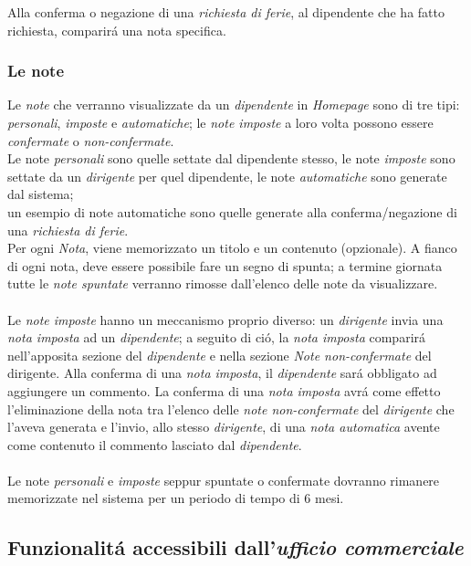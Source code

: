 \documentclass[paper=a4, fontsize=11pt]{scrartcl} %
\numberwithin{equation}{section} %
\numberwithin{figure}{section} %
\numberwithin{table}{section} %
\begin{document}
Alla conferma o negazione di una \textit{richiesta di ferie}, al dipendente che ha fatto richiesta, comparir\'a una
nota specifica.


\subsubsection{Le note}

Le \textit{note} che verranno visualizzate da un \textit{dipendente} in \textit{Homepage} sono di tre tipi:
\textit{personali}, \textit{imposte} e \textit{automatiche}; le \textit{note imposte} a loro volta possono
essere \textit{confermate} o \textit{non-confermate}.\\
Le note \textit{personali} sono quelle settate dal dipendente stesso,
le note \textit{imposte} sono settate da un \textit{dirigente} per quel dipendente,
le note \textit{automatiche} sono generate dal sistema;\\
un esempio di note automatiche sono quelle generate alla conferma/negazione di una \textit{richiesta di ferie}.\\
Per ogni \textit{Nota}, viene memorizzato un titolo e un contenuto (opzionale).
A fianco di ogni nota, deve essere possibile fare un segno di spunta; a termine giornata tutte le \textit{note spuntate}
verranno rimosse dall'elenco delle note da visualizzare.\\\\
Le \textit{note imposte} hanno un meccanismo proprio diverso:
un \textit{dirigente} invia una \textit{nota imposta} ad un \textit{dipendente}; a seguito di ci\'o, la \textit{nota imposta}
comparir\'a nell'apposita sezione del \textit{dipendente} e nella sezione \textit{Note non-confermate} del dirigente.
Alla conferma di una \textit{nota imposta}, il \textit{dipendente} sar\'a obbligato ad aggiungere un commento.
La conferma di una \textit{nota imposta} avr\'a come effetto l'eliminazione della nota tra l'elenco delle \textit{note non-confermate}
del \textit{dirigente} che l'aveva generata e l'invio, allo stesso \textit{dirigente}, di una \textit{nota automatica}
avente come contenuto il commento lasciato dal \textit{dipendente}.\\\\
Le note \textit{personali} e \textit{imposte} seppur spuntate o confermate dovranno rimanere memorizzate nel sistema per un periodo
di tempo di 6 mesi.

\subsection{Funzionalit\'a accessibili dall'\textit{ufficio commerciale}}
\end{document}
